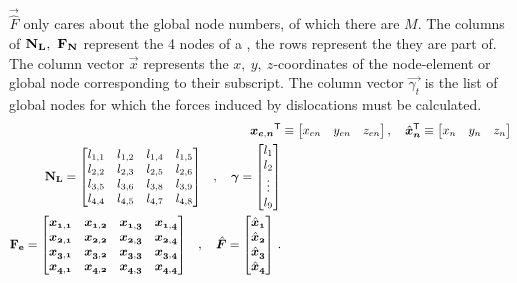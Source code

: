 	$ \vec{\hat{F}} $ only cares about the global node numbers, of which there are $ M $. The columns of $ \mathbf{N_{L}},~ \mathbf{F_{N}} $ represent the 4 nodes of a , the rows represent the  they are part of. The column vector $ \vec{x} $ represents the $ x,~y,~z$-coordinates of the node-element or global node corresponding to their subscript. The column vector $ \vec{\gamma_{t}} $ is the list of global nodes for which the forces induced by dislocations must be calculated.
	\begin{align}
		\vec{x_{e,n}}^{\mathsf{T}} &\equiv	\begin{bmatrix}
			x_{en} & y_{en} & z_{en}
		\end{bmatrix}, \quad
		\vec{\hat{x}_{n}}^{\mathsf{T}} \equiv	\begin{bmatrix}
			x_{n} & y_{n} & z_{n}
		\end{bmatrix}\\
		\begin{split}
			\mtx{N_{L}} &=	\begin{bmatrix}
				l_{1,1} & l_{1,2} & l_{1,4} & l_{1,5}\\
				l_{2,2} & l_{2,3} & l_{2,5} & l_{2,6}\\
				l_{3,5} & l_{3,6} & l_{3,8} & l_{3,9}\\
				l_{4,4} & l_{4,5} & l_{4,7} & l_{4,8}\\
			\end{bmatrix}
		\end{split}
		, \quad
		\vec{\gamma} =   \begin{bmatrix}
			l_1\\
			l_2\\
			\vdots\\
			l_9
		\end{bmatrix}\\
		\begin{split}
			\mtx{F_{e}} &=	\begin{bmatrix}
				\vec{x_{1,1}} & \vec{x_{1,2}} & \vec{x_{1,3}} & \vec{x_{1,4}}\\
				\vec{x_{2,1}} & \vec{x_{2,2}} & \vec{x_{2,3}} & \vec{x_{2,4}}\\
				\vec{x_{3,1}} & \vec{x_{3,2}} & \vec{x_{3,3}} & \vec{x_{3,4}}\\
				\vec{x_{4,1}} & \vec{x_{4,2}} & \vec{x_{4,3}} & \vec{x_{4,4}}\\
			\end{bmatrix}
		\end{split}
		,\quad
		\vec{\hat{F}} = 	\begin{bmatrix}
			\vec{\hat{x}_{1}}\\
			\vec{\hat{x}_{2}}\\
			\vec{\hat{x}_{3}}\\
			\vec{\hat{x}_{4}}
		\end{bmatrix}\,.\label{e:force_imp}
	\end{align}
		
		